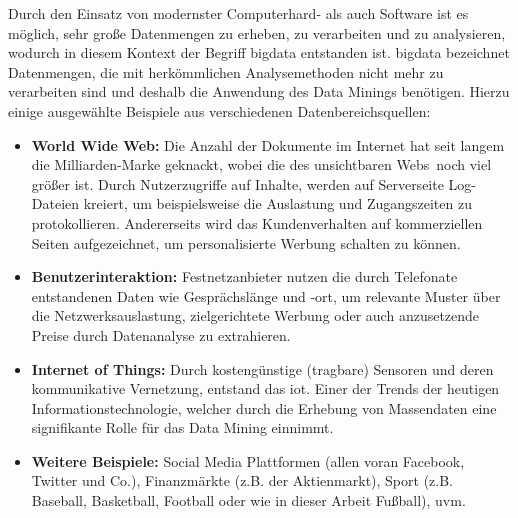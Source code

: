 Durch den Einsatz von modernster Computerhard- als auch Software ist es möglich, sehr große Datenmengen zu erheben, zu verarbeiten und zu analysieren, wodurch in diesem Kontext der Begriff \gls{bigdata} entstanden ist. \gls{bigdata} bezeichnet Datenmengen, die mit herkömmlichen Analysemethoden nicht mehr zu verarbeiten sind und deshalb die Anwendung des Data Minings benötigen. Hierzu einige ausgewählte Beispiele aus verschiedenen Datenbereichsquellen:

\begin{itemize}
\item \textbf{World Wide Web:} Die Anzahl der Dokumente im Internet hat seit langem die Milliarden-Marke geknackt, wobei die des unsichtbaren \glqq Webs\grqq~noch viel größer ist. Durch Nutzerzugriffe auf Inhalte, werden auf Serverseite Log-Dateien kreiert, um beispielsweise die Auslastung und Zugangszeiten zu protokollieren. Andererseits wird das Kundenverhalten auf kommerziellen Seiten aufgezeichnet, um personalisierte Werbung schalten zu können.

\item \textbf{Benutzerinteraktion:} Festnetzanbieter nutzen die durch Telefonate entstandenen Daten wie Gesprächslänge und -ort, um relevante Muster über die Netzwerksauslastung, zielgerichtete Werbung oder auch anzusetzende Preise durch Datenanalyse zu extrahieren.
\item \textbf{Internet of Things:} Durch kostengünstige (tragbare) Sensoren und deren kommunikative Vernetzung, entstand das \gls{iot}. Einer der Trends der heutigen Informationstechnologie, welcher durch die Erhebung von Massendaten eine signifikante Rolle für das Data Mining einnimmt.

\item \textbf{Weitere Beispiele:}  Social Media Plattformen (allen voran Facebook, Twitter und Co.), Finanzmärkte (z.B. der Aktienmarkt), Sport (z.B. Baseball, Basketball, Football oder wie in dieser Arbeit Fußball), uvm. 
\end{itemize}

